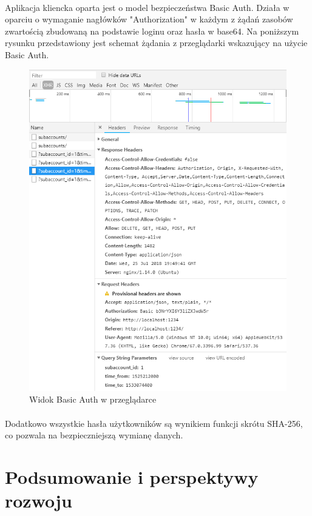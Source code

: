 \documentclass{article}
\begin{document}
\paragraph*{} Aplikacja kliencka oparta jest o model bezpieczeństwa Basic Auth. Działa w oparciu o wymaganie nagłówków "Authorization" w każdym z żądań zasobów zwartością zbudowaną na podstawie loginu oraz hasła w base64. Na poniższym rysunku przedstawiony jest schemat żądania z przeglądarki wskazujący na użycie Basic Auth.
\begin{figure}[H]
	\hspace*{-1cm}
	\includegraphics[scale=0.8]{assets/basicAuth.png}
	\caption[]{Widok Basic Auth w przeglądarce}
	\label{fig:basic }
\end{figure}
\paragraph*{} Dodatkowo wszystkie hasła użytkowników są wynikiem funkcji skrótu SHA-256, co pozwala na bezpieczniejszą wymianę danych.
\section{Podsumowanie i perspektywy rozwoju}
\end{document}
